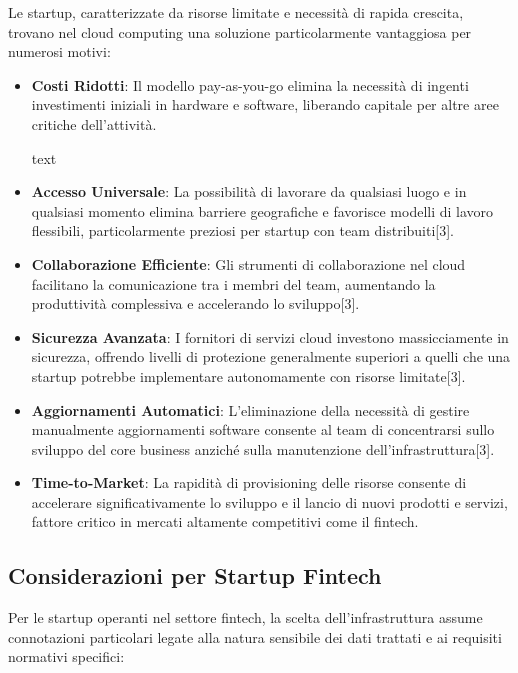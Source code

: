 \documentclass[a4paper,12pt]{report}
\begin{document}
Le startup, caratterizzate da risorse limitate e necessità di rapida crescita, trovano nel cloud computing una soluzione particolarmente vantaggiosa per numerosi motivi:

\begin{itemize}
\item \textbf{Costi Ridotti}: Il modello pay-as-you-go elimina la necessità di ingenti investimenti iniziali in hardware e software, liberando capitale per altre aree critiche dell'attività.

text
\item \textbf{Accesso Universale}: La possibilità di lavorare da qualsiasi luogo e in qualsiasi momento elimina barriere geografiche e favorisce modelli di lavoro flessibili, particolarmente preziosi per startup con team distribuiti[3].

\item \textbf{Collaborazione Efficiente}: Gli strumenti di collaborazione nel cloud facilitano la comunicazione tra i membri del team, aumentando la produttività complessiva e accelerando lo sviluppo[3].

\item \textbf{Sicurezza Avanzata}: I fornitori di servizi cloud investono massicciamente in sicurezza, offrendo livelli di protezione generalmente superiori a quelli che una startup potrebbe implementare autonomamente con risorse limitate[3].

\item \textbf{Aggiornamenti Automatici}: L'eliminazione della necessità di gestire manualmente aggiornamenti software consente al team di concentrarsi sullo sviluppo del core business anziché sulla manutenzione dell'infrastruttura[3].

\item \textbf{Time-to-Market}: La rapidità di provisioning delle risorse consente di accelerare significativamente lo sviluppo e il lancio di nuovi prodotti e servizi, fattore critico in mercati altamente competitivi come il fintech.
\end{itemize}

\subsection{Considerazioni per Startup Fintech}

Per le startup operanti nel settore fintech, la scelta dell'infrastruttura assume connotazioni particolari legate alla natura sensibile dei dati trattati e ai requisiti normativi specifici:
\end{document}
